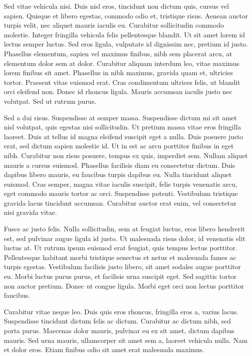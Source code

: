 Sed vitae vehicula nisi. Duis nisl eros, tincidunt non dictum quis, cursus vel
sapien. Quisque et libero egestas, commodo odio et, tristique risus. Aenean
auctor turpis velit, nec aliquet mauris iaculis eu. Curabitur sollicitudin
commodo molestie. Integer fringilla vehicula felis pellentesque blandit. Ut sit
amet lorem id lectus semper luctus. Sed eros ligula, vulputate id dignissim
nec, pretium id justo. Phasellus elementum, sapien vel maximus finibus, nibh
sem placerat arcu, at elementum dolor sem at dolor. Curabitur aliquam interdum
leo, vitae maximus lorem finibus sit amet. Phasellus in nibh maximus, gravida
quam et, ultricies tortor. Praesent vitae euismod erat. Cras condimentum
ultrices felis, ut blandit orci eleifend non. Donec id rhoncus ligula. Mauris
accumsan iaculis justo nec volutpat. Sed ut rutrum purus.

Sed a dui risus. Suspendisse at semper massa. Suspendisse dictum mi sit amet
nisl volutpat, quis egestas nisi sollicitudin. Ut pretium massa vitae eros
fringilla laoreet. Duis at tellus id magna eleifend suscipit eget a nulla. Duis
posuere justo erat, sed dictum sapien molestie id. Ut in est ac arcu porttitor
finibus in eget nibh. Curabitur non risus posuere, tempus ex quis, imperdiet
sem. Nullam aliquet mauris a cursus euismod. Phasellus facilisis diam eu
consectetur dictum. Duis dapibus libero mauris, eu faucibus turpis dapibus eu.
Nulla tincidunt aliquet euismod. Cras semper, magna vitae iaculis suscipit,
felis turpis venenatis arcu, eget commodo mauris tortor ac orci. Suspendisse
potenti. Vestibulum tristique gravida lacus tincidunt accumsan. Curabitur
auctor erat enim, vel consectetur nisi gravida vitae.

Fusce ac justo felis. Nulla sollicitudin, sem at feugiat luctus, eros libero
hendrerit est, sed pulvinar augue ligula id justo. Ut malesuada risus dolor, id
venenatis elit luctus at. Ut rutrum ipsum euismod erat feugiat, quis tempus
lectus porttitor. Pellentesque habitant morbi tristique senectus et netus et
malesuada fames ac turpis egestas. Vestibulum facilisis justo libero, sit amet
sodales augue porttitor eu. Morbi luctus purus purus, et facilisis urna
suscipit eget. Sed sagittis tortor non auctor pretium. Donec ut congue ligula.
Morbi eget orci non lectus porttitor faucibus.

Curabitur vitae neque leo. Duis quis eros rhoncus, fringilla eros a, varius
lacus. Suspendisse tincidunt dictum felis ac dictum. Curabitur ac dictum nibh,
sed porta purus. Maecenas dolor mauris, pulvinar eu ex sit amet, dictum dapibus
mauris. Sed urna mauris, ullamcorper sit amet sem a, laoreet vehicula nulla.
Nam et dolor eros. Etiam finibus odio sit amet erat malesuada maximus.


